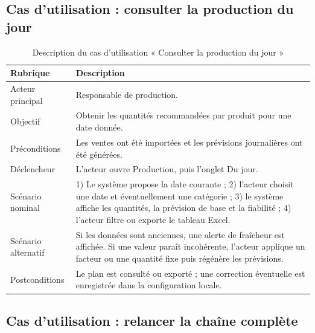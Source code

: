 \subsection{Cas d'utilisation : consulter la production du jour}

\begin{table}[H]
\centering
\caption{Description du cas d'utilisation « Consulter la production du jour »}
\label{tab:uc-production-jour}
\begin{tabularx}{\textwidth}{p{3.7cm}Y}
\toprule
\textbf{Rubrique} & \textbf{Description} \\
\midrule
Acteur principal & Responsable de production. \\
Objectif & Obtenir les quantités recommandées par produit pour une date donnée. \\
Préconditions & Les ventes ont été importées et les prévisions journalières ont été générées. \\
Déclencheur & L'acteur ouvre Production, puis l'onglet Du jour. \\
Scénario nominal & 1) Le système propose la date courante ; 2) l'acteur choisit une date et éventuellement une catégorie ; 3) le système affiche les quantités, la prévision de base et la fiabilité ; 4) l'acteur filtre ou exporte le tableau Excel. \\
Scénario alternatif & Si les données sont anciennes, une alerte de fraîcheur est affichée. Si une valeur paraît incohérente, l'acteur applique un facteur ou une quantité fixe puis régénère les prévisions. \\
Postconditions & Le plan est consulté ou exporté ; une correction éventuelle est enregistrée dans la configuration locale. \\
\bottomrule
\end{tabularx}
\end{table}

\subsection{Cas d'utilisation : relancer la chaîne complète}

